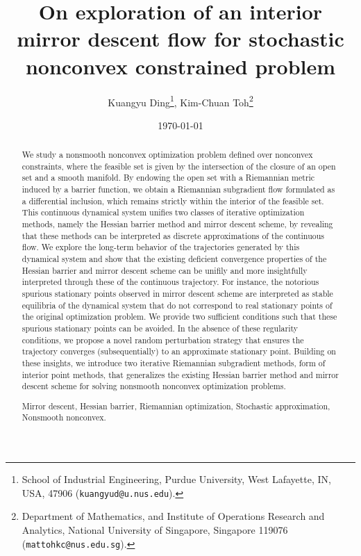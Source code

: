 \documentclass[11pt]{article}
\begin{document}
\title{On exploration of an interior mirror descent flow for stochastic nonconvex constrained problem}
\author{
Kuangyu Ding\thanks{School of Industrial Engineering, Purdue University, West Lafayette, IN, USA,
         47906 ({\tt kuangyud@u.nus.edu}).
         }, \quad 
Kim-Chuan Toh\thanks{Department of Mathematics, and Institute of 
Operations Research and Analytics, National
         University of Singapore, 
       Singapore
         119076 ({\tt mattohkc@nus.edu.sg}).
         }
        }
\date{\today}

\maketitle

\begin{abstract}
We study a nonsmooth nonconvex optimization problem defined over nonconvex constraints, where the feasible set is given by the intersection of the closure of an open set and a smooth manifold. By endowing the open set with a Riemannian metric induced by a barrier function, we obtain a Riemannian subgradient flow formulated as a differential inclusion, which remains strictly within the interior of the feasible set. This continuous dynamical system unifies two classes of iterative optimization methods, namely the Hessian barrier method and mirror descent scheme, by revealing that these methods can be interpreted as discrete approximations of the continuous flow. We explore the long-term behavior of the trajectories generated by this dynamical system and show that the existing deficient convergence properties of the Hessian barrier and mirror descent scheme can be unifily and more insightfully interpreted through these of the continuous trajectory. For instance, the notorious spurious stationary points \cite{chen2024spurious} observed in mirror descent scheme are interpreted as stable equilibria of the dynamical system that do not correspond to real stationary points of the original optimization problem. We provide two sufficient conditions such that these spurious stationary points can be avoided. In the absence of these regularity conditions, we propose a novel random perturbation strategy that ensures the trajectory converges (subsequentially) to an approximate stationary point. Building on these insights, we introduce two iterative Riemannian subgradient methods, form of interior point methods, that generalizes the existing Hessian barrier method and mirror descent scheme for solving nonsmooth nonconvex optimization problems. 
\medskip

 Mirror descent, Hessian barrier, Riemannian optimization, Stochastic approximation, Nonsmooth nonconvex. 
\end{abstract}
\end{document}
